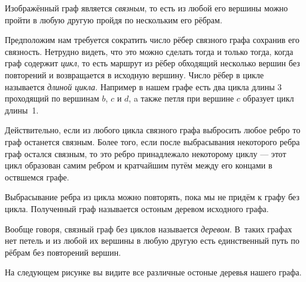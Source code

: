 \documentclass{article}
\begin{document}
Изображённый граф является \emph{связным}, то есть из любой его вершины можно пройти в любую другую пройдя по нескольким его рёбрам.

Предположим нам требуется сократить число рёбер связного графа сохранив его связность.
Нетрудно видеть, что это можно сделать тогда и только тогда, когда граф содержит \emph{цикл},
то есть маршрут из рёбер обходящий несколько вершин без повторений и возвращается в исходную вершину. 
Число рёбер в цикле называется \emph{длиной цикла}.
Например в нашем графе есть два цикла  длины 3 проходящий по вершинам $b$, $c$ и $d$, 
a также петля при вершине $c$ образует цикл длины~1.

Действительно, если из любого цикла связного графа выбросить любое ребро то граф останется связным.
Более того, если после выбрасывания некоторого ребра граф остался связным, то это ребро принадлежало некоторому циклу --- этот цикл образован самим ребром и кратчайшим путём между его концами в оствшемся графе.

Выбрасывание ребра из цикла можно повторять, пока мы не придём к графу без цикла.
Полученный граф называется остоным деревом исходного графа.

Вообще говоря, связный граф без циклов называется \emph{деревом}.
В~таких графах нет петель и из любой их вершины в любую другую есть единственный путь по рёбрам без повторений вершин.

На следующем рисунке вы видите все различные остоные деревья нашего графа.
\end{document}

